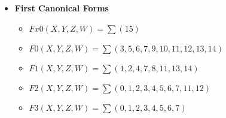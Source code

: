 \begin{itemize}
\begin{itemize}
        \item $F0(X, Y, Z, W) =  (X+Y+Z+W) . (X+Y+Z+\overline{W}) . (X+Y+\overline{Z}+W) . (X+\overline{Y}+Z+W) . (\overline{X}+Y+Z+W) . (\overline{X}+\overline{Y}+\overline{Z}+\overline{W})$
    
        \item $F1(X, Y, Z, W) =  (X+Y+Z+W) . (X+Y+\overline{Z}+\overline{W}) . (X+\overline{Y}+Z+\overline{W}) . (X+\overline{Y}+\overline{Z}+W) . (\overline{X}+Y+Z+\overline{W}) . (\overline{X}+Y+\overline{Z}+W) . (\overline{X}+\overline{Y}+Z+W) . (\overline{X}+\overline{Y}+\overline{Z}+\overline{W})$
    
        \item $F2(X, Y, Z, W) =  (\overline{X}+Y+Z+W) . (\overline{X}+Y+Z+\overline{W}) . (\overline{X}+Y+\overline{Z}+W) . (\overline{X}+\overline{Y}+Z+\overline{W}) . (\overline{X}+\overline{Y}+\overline{Z}+W) . (\overline{X}+\overline{Y}+\overline{Z}+\overline{W})$
    
        \item $F3(X, Y, Z, W) =  (\overline{X}+Y+Z+W) . (\overline{X}+Y+Z+\overline{W}) . (\overline{X}+Y+\overline{Z}+W) . (\overline{X}+Y+\overline{Z}+\overline{W}) . (\overline{X}+\overline{Y}+Z+W) . (\overline{X}+\overline{Y}+Z+\overline{W}) . (\overline{X}+\overline{Y}+\overline{Z}+W) . (\overline{X}+\overline{Y}+\overline{Z}+\overline{W})$
    
    \end{itemize}

\item \textbf{First Canonical Forms }
    \begin{itemize}
    
        \item $Fx0(X, Y, Z, W) = \sum(15)$
    
        \item $F0(X, Y, Z, W) = \sum(3, 5, 6, 7, 9, 10, 11, 12, 13, 14)$
    
        \item $F1(X, Y, Z, W) = \sum(1, 2, 4, 7, 8, 11, 13, 14)$
    
        \item $F2(X, Y, Z, W) = \sum(0, 1, 2, 3, 4, 5, 6, 7, 11, 12)$
    
        \item $F3(X, Y, Z, W) = \sum(0, 1, 2, 3, 4, 5, 6, 7)$
    
    \end{itemize}


\end{itemize}
